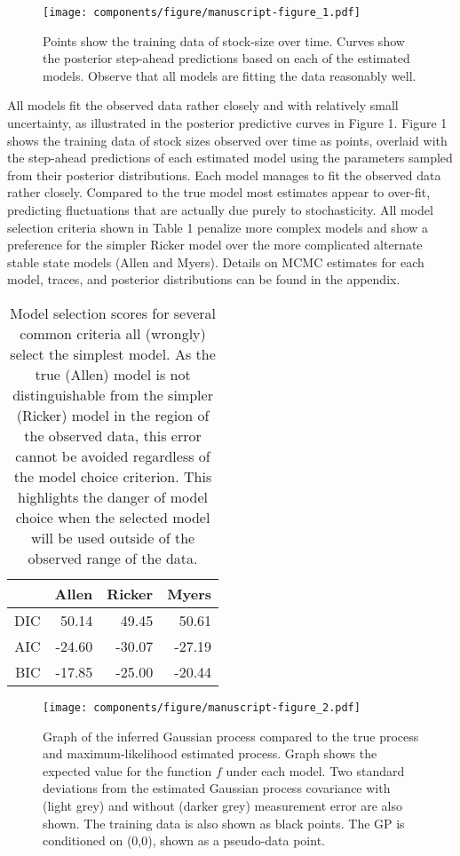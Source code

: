 \documentclass[author-year, 12pt,review]{elsarticle} %
\makeatletter
\def\maxwidth{\ifdim\Gin@nat@width>\linewidth\linewidth
\else\Gin@nat@width\fi}
\let\Oldincludegraphics\includegraphics
\renewcommand{\includegraphics}[1]{\Oldincludegraphics[width=\maxwidth]{#1}}
\makeatother
\begin{document}
\begin{figure}[htbp]
\centering
\texttt{[image: components/figure/manuscript-figure\_1.pdf]}
\caption{Points show the training data of stock-size over time. Curves
show the posterior step-ahead predictions based on each of the estimated
models. Observe that all models are fitting the data reasonably well.}
\end{figure}

All models fit the observed data rather closely and with relatively
small uncertainty, as illustrated in the posterior predictive curves in
Figure 1. Figure 1 shows the training data of stock sizes observed over
time as points, overlaid with the step-ahead predictions of each
estimated model using the parameters sampled from their posterior
distributions. Each model manages to fit the observed data rather
closely. Compared to the true model most estimates appear to over-fit,
predicting fluctuations that are actually due purely to stochasticity.
All model selection criteria shown in Table 1 penalize more complex
models and show a preference for the simpler Ricker model over the more
complicated alternate stable state models (Allen and Myers). Details on
MCMC estimates for each model, traces, and posterior distributions can
be found in the appendix.

\begin{table}[ht]
\begin{center}
\begin{tabular}{rrrr}
  \hline
 & Allen & Ricker & Myers \\ 
  \hline
DIC & 50.14 & 49.45 & 50.61 \\ 
  AIC & -24.60 & -30.07 & -27.19 \\ 
  BIC & -17.85 & -25.00 & -20.44 \\ 
   \hline
\end{tabular}
\caption{Model selection scores for several common criteria all (wrongly) select the simplest model. As the true (Allen) model is not distinguishable from the simpler (Ricker) model in the region of the observed data, this error cannot be avoided regardless of the model choice criterion. This highlights the danger of model choice when the selected model will be used outside of the observed range of the data.}
\end{center}
\end{table}

\begin{figure}[htbp]
\centering
\texttt{[image: components/figure/manuscript-figure\_2.pdf]}
\caption{Graph of the inferred Gaussian process compared to the true
process and maximum-likelihood estimated process. Graph shows the
expected value for the function $f$ under each model. Two standard
deviations from the estimated Gaussian process covariance with (light
grey) and without (darker grey) measurement error are also shown. The
training data is also shown as black points. The GP is conditioned on
(0,0), shown as a pseudo-data point.}
\end{figure}
\end{document}
